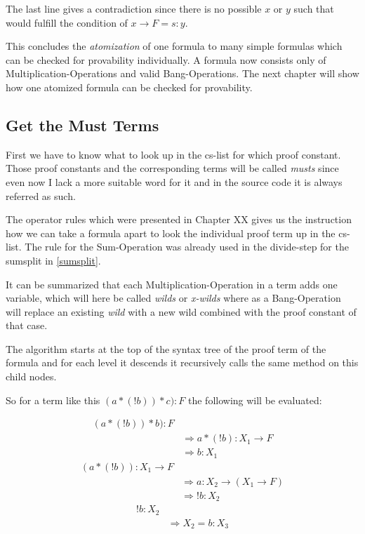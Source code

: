 The last line gives a contradiction since there is no possible $x$ or $y$ such that would fulfill the condition of $x \rightarrow F = s:y$.



\par
This concludes the \emph{atomization} of one formula to many simple formulas which can be checked for provability individually. A formula now consists only of Multiplication-Operations and valid Bang-Operations. The next chapter will show how one atomized formula can be checked for provability.

\subsection{Get the Must Terms}
First we have to know what to look up in the cs-list for which proof constant. Those proof constants and the corresponding terms will be called \emph{musts} since even now I lack a more suitable word for it and in the source code it is always referred as such.

The operator rules which were presented in Chapter XX gives us the instruction how we can take a formula apart to look the individual proof term up in the cs-list. The rule for the Sum-Operation was already used in the divide-step for the sumsplit in \ref{sumsplit}.

It can be summarized that each Multiplication-Operation in a term adds one variable, which will here be called \emph{wilds} or \emph{x-wilds} where as a Bang-Operation will replace an existing \emph{wild} with a new wild combined with the proof constant of that case. 

The algorithm starts at the top of the syntax tree of the proof term of the formula and for each level it descends it recursively calls the same method on this child nodes.

So for a term like this $(a*(!b))*c):F$ the following will be evaluated:

\begin{equation}\label{musts}
\begin{split}
	(a*(!b))*b):F \\
	& \Rightarrow a*(!b):  X_1 \rightarrow F \\
	& \Rightarrow b:  X_1
\end{split}
\end{equation}
\begin{equation}\label{musts1}
\begin{split}
	(a*(!b)): X_1 \rightarrow F \\
	& \Rightarrow a: X_2 \rightarrow (X_1 \rightarrow F)\\
	& \Rightarrow !b: X_2
\end{split}
\end{equation}
\begin{equation}\label{musts2}
\begin{split}
	!b: X_2 \\
	& \Rightarrow X_2 = b:X_3
\end{split}
\end{equation}

